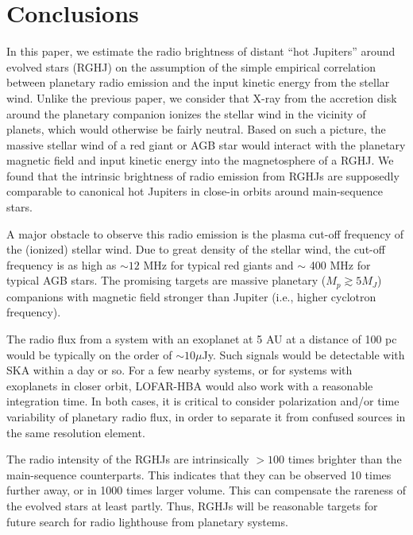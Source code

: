 \documentclass[iop,numberedappendix,apj]{emulateapj}
\begin{document}


\section{Conclusions}
\label{sec:conc}

In this paper, we estimate the radio brightness of distant ``hot Jupiters'' around evolved stars (RGHJ) on the assumption of the simple empirical correlation between planetary radio emission and the input kinetic energy from the stellar wind. 
Unlike the previous paper, we consider that X-ray from the accretion disk around the planetary companion ionizes the stellar wind in the vicinity of planets, which would otherwise be fairly neutral. 
Based on such a picture, the massive stellar wind of a red giant or AGB star would interact with the planetary magnetic field and input kinetic energy into the magnetosphere of a RGHJ. 
We found that the intrinsic brightness of radio emission from RGHJs are supposedly comparable to canonical hot Jupiters in close-in orbits around main-sequence stars. 

A major obstacle to observe this radio emission is the plasma cut-off frequency of the (ionized) stellar wind. Due to great density of the stellar wind, the cut-off frequency is as high as $\sim 12$ MHz for typical red giants and $\sim$ 400 MHz for typical AGB stars. 
The promising targets are massive planetary ($M_p \gtrsim 5M_J$) companions with magnetic field stronger than Jupiter (i.e., higher cyclotron frequency). 

The radio flux from a system with an exoplanet at 5 AU at a distance of 100 pc would be typically on the order of $\sim 10 \mu $Jy. 
Such signals would be detectable with SKA within a day or so. 
For a few nearby systems, or for systems with exoplanets in closer orbit, LOFAR-HBA  would also work with a reasonable integration time. 
In both cases, it is critical to consider polarization and/or time variability of planetary radio flux, in order to separate it from confused sources in the same resolution element. 

The radio intensity of the RGHJs are intrinsically $>100$ times brighter than the main-sequence counterparts. This indicates that they can be observed 10 times further away, or in 1000 times larger volume. 
This can compensate the rareness of the evolved stars at least partly. Thus, RGHJs will be reasonable targets for future search for radio lighthouse from planetary systems. 
\end{document}
